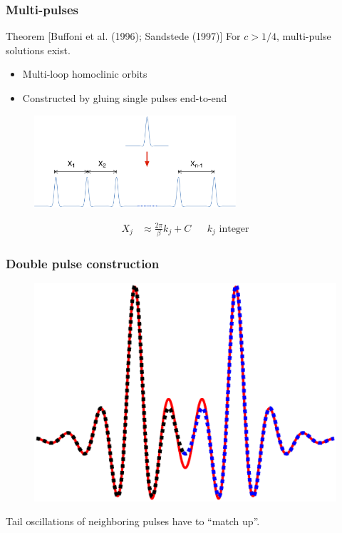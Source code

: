 \documentclass[16pt]{beamer}
\begin{document}
\begin{frame}
\frametitle{Multi-pulses} 
    \begin{block}{Theorem [Buffoni et al. (1996); Sandstede (1997)]}
    \large
    For $c > 1/4$, multi-pulse solutions exist.
    \begin{itemize}
    	\item Multi-loop homoclinic orbits
    	\item Constructed by gluing single pulses end-to-end
    \end{itemize}

	\begin{figure}
	\begin{center}
	\includegraphics[width=7.5cm]{images/multipulse.png}
	\end{center}
	\begin{align*}
	 X_j &\approx \frac{2 \pi}{\beta} k_j + C && k_j \text{ integer}
	\end{align*}
	\end{figure}

    \end{block}
\end{frame}

\begin{frame}
	\frametitle{Double pulse construction}
	\begin{figure}
	\begin{center}
	\includegraphics[width=0.7\linewidth]{images/dpconstruction.eps}
	\end{center}
	\end{figure}
	Tail oscillations of neighboring pulses have to ``match up''.
\end{frame}
\end{document}
